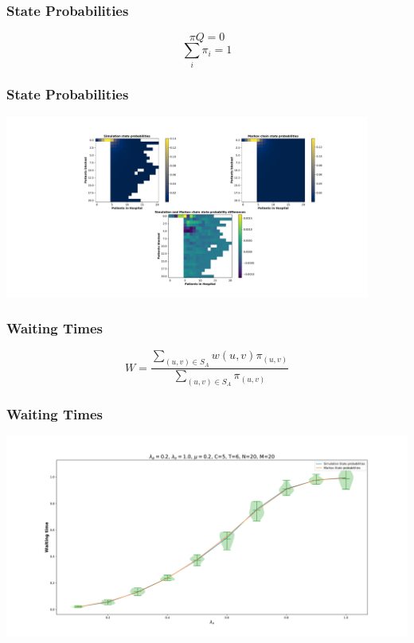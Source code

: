 \begin{frame}
    \frametitle{State Probabilities}

    \centering
    \[ \pi Q = 0 \]
    \[ \sum_{i} \pi_i = 1 \]

\end{frame}

\begin{frame}
    \frametitle{State Probabilities}
    \centering
    \includegraphics[trim=850 350 180 70, clip, width=0.9\textwidth]{Bin/src/heatmap.pdf}
\end{frame}


\begin{frame}
    \frametitle{Waiting Times}

    \[        
    W = \frac{\sum_{(u,v) \in S_A} w(u,v) \pi_{(u,v)}}{\sum_{(u,v) \in S_A} \pi_{(u,v)}}
    \]

\end{frame}

\begin{frame}
    \frametitle{Waiting Times}
    \centering
    \includegraphics[trim=110 40 110 60, clip, width=\textwidth]{Bin/src/waiting_times.pdf}
\end{frame}
